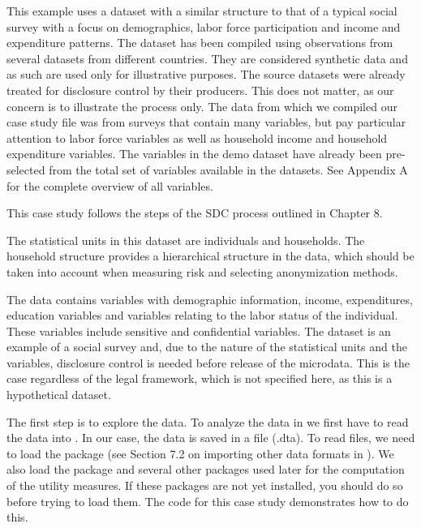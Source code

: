 \documentclass[letterpaper,10pt,english]{sphinxmanual}
\begin{document}
This example uses a dataset with a similar structure to that of a
typical social survey with a focus on demographics, labor force
participation and income and expenditure patterns. The dataset has been
compiled using observations from several datasets from different
countries. They are considered synthetic data and as such are used only
for illustrative purposes. The source datasets were already treated for
disclosure control by their producers. This does not matter, as our
concern is to illustrate the process only. The data from which we
compiled our case study file was from surveys that contain many
variables, but pay particular attention to labor force variables as well
as household income and household expenditure variables. The variables
in the demo dataset have already been pre-selected from the total set of
variables available in the datasets. See Appendix A for the complete
overview of all variables.

This case study follows the steps of the SDC process outlined in Chapter
8.


The statistical units in this dataset are individuals and households.
The household structure provides a hierarchical structure in the data,
which should be taken into account when measuring risk and selecting
anonymization methods.

The data contains variables with demographic information, income,
expenditures, education variables and variables relating to the labor
status of the individual. These variables include sensitive and
confidential variables. The dataset is an example of a social survey
and, due to the nature of the statistical units and the variables,
disclosure control is needed before release of the microdata. This is
the case regardless of the legal framework, which is not specified here,
as this is a hypothetical dataset.


The first step is to explore the data. To analyze the data in  we
first have to read the data into . In our case, the data is saved in
a  file (.dta). To read  files, we need to load the 
package  (see Section 7.2 on importing other data formats in
). We also load the  package and several other packages
used later for the computation of the utility measures. If these
packages are not yet installed, you should do so before trying to load
them. The  code for this case study demonstrates how to do this.
\end{document}
